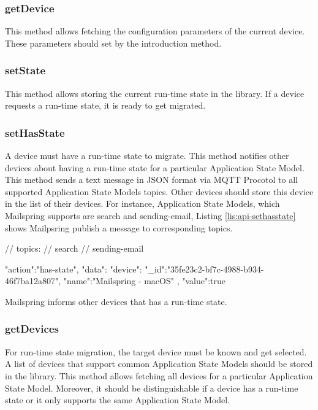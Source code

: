 \subsubsection{getDevice}
This method allows fetching the configuration parameters of the current device. These parameters should set by the introduction method.

\subsubsection{setState}
This method allows storing the current run-time state in the library. If a  device requests a run-time state, it is ready to get migrated. 

\subsubsection{setHasState}
A device must have a run-time state to migrate. This method notifies other devices about having a run-time state for a particular Application State Model. This method sends a text message in JSON format via MQTT Procotol to all supported Application State Models topics. Other devices should store this device in the list of their devices. For instance, Application State Models, which Mailspring supports are search and sending-email, Listing \ref{lis:api-sethasstate} shows Mailpsring publish a message to corresponding topics.


\FloatBarrier
\begin{code}
\begin{js2}
// topics:
// search
// sending-email
\end{js2}

\begin{json}
{
   "action":"has-state",
   "data":{
      "device":{
         "_id":"35fe23c2-bf7c-4988-b934-46f7ba12a807",
         "name":"Mailspring - macOS"
      },
      "value":true
   }
}
\end{json}
\caption{Mailspring informs other devices that has a run-time state.}
\label{lis:api-sethasstate}
\end{code}
\FloatBarrier


\subsubsection{getDevices}
For run-time state migration, the target device must be known and get selected. A list of devices that support common Application State Models should be stored in the library. This method allows fetching all devices for a particular Application State Model. Moreover, it should be distinguishable if a device has a run-time state or it only supports the same Application State Model.


